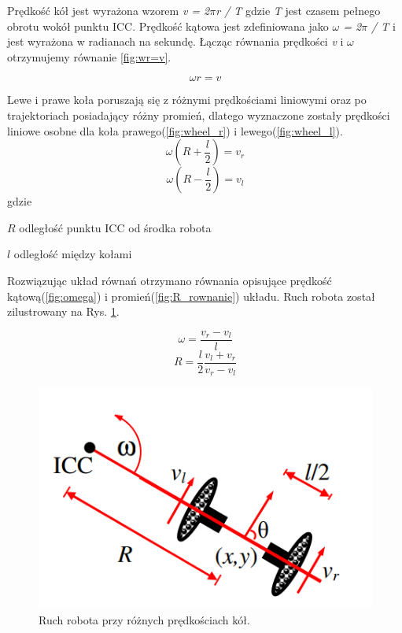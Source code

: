 Prędkość kół jest wyrażona wzorem \textit{v = 2$\pi$r / T} gdzie \textit{T} jest czasem pełnego obrotu wokół punktu ICC. Prędkość kątowa jest zdefiniowana jako \textit{$\omega$ = 2$\pi$ / T} i jest wyrażona w radianach na sekundę. Łącząc równania prędkości \textit{v} i \textit{$\omega$} otrzymujemy równanie \ref{fig:wr=v}.

\begin{equation}
\omega r = v
\label{fig:wr=v}
\end{equation}

Lewe i prawe koła poruszają się z różnymi prędkościami liniowymi oraz po trajektoriach posiadający różny promień, dlatego wyznaczone zostały prędkości liniowe osobne dla koła prawego(\ref{fig:wheel_r}) i lewego(\ref{fig:wheel_l}).
\begin{equation}
\omega (R+\frac{l}{2})=v_r
\label{fig:wheel_r}
\end{equation}
\begin{equation}
\omega (R-\frac{l}{2})=v_l
\label{fig:wheel_l}
\end{equation}
gdzie
\begin{eqwhere}[2cm]
	\item[$R$] odległość punktu ICC od środka robota
	\item[$l$] odległość między kołami 
\end{eqwhere}

Rozwiązując układ równań otrzymano równania opisujące prędkość kątową(\ref{fig:omega}) i promień(\ref{fig:R_rownanie}) układu. Ruch robota został zilustrowany na Rys. \ref{fig:diff_drive3}.

\begin{equation}
\omega = \frac{v_r-v_l}{l}
\label{fig:omega}
\end{equation}
\begin{equation}
R = \frac{l}{2} \frac{v_l+v_r}{v_r-v_l}
\label{fig:R_rownanie}
\end{equation}

\begin{figure}[!h]
	\centering
	\includegraphics[scale=0.6]{diff_drive3.png}
	\caption{Ruch robota przy różnych prędkościach kół.}
	\label{fig:diff_drive3}
\end{figure}

